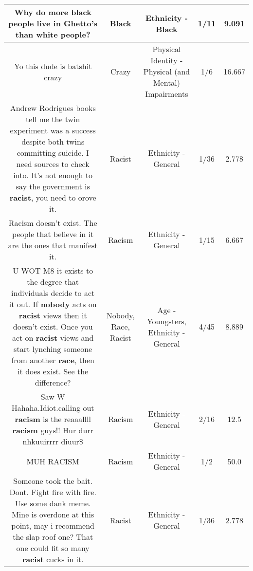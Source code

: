 \documentclass[11pt]{article}
\newlength\mylength
\begin{document}
\begin{center}
\begin{longtable}{|C{.65\mylength}|C{.30\mylength}|C{.12\mylength}|C{.12\mylength}|C{.12\mylength}|}
  \small Why do more \textbf{black} people live in Ghetto's than white people?\normalsize   & Black & Ethnicity - Black & 1/11 & 9.091 \\  \hline
  \small Yo this dude is batshit crazy\normalsize   & Crazy & Physical Identity - Physical (and Mental) Impairments & 1/6 & 16.667 \\  \hline
  \small Andrew Rodrigues books tell me the twin experiment was a success despite both twins committing suicide. I need sources to check into. It's not enough to say the government is \textbf{racist}, you need to orove it.\normalsize   & Racist & Ethnicity - General & 1/36 & 2.778 \\  \hline
  \small Racism doesn't exist. The people that believe in it are the ones that manifest it.\normalsize   & Racism & Ethnicity - General & 1/15 & 6.667 \\  \hline
  \small U WOT M8 it exists to the degree that individuals decide to act it out. If \textbf{nobody} acts on \textbf{racist} views then it doesn't exist. Once you act on \textbf{racist} views and start lynching someone from another \textbf{race}, then it does exist. See the difference?\normalsize   & Nobody, Race, Racist & Age - Youngsters, Ethnicity - General & 4/45 & 8.889 \\  \hline
  \small Saw W Hahaha.Idiot.calling out \textbf{racism} is the reaaallll \textbf{racism} guys!! Hur durr nhkuuirrrr diuur\$\normalsize   & Racism & Ethnicity - General & 2/16 & 12.5 \\  \hline
  \small MUH RACISM\normalsize   & Racism & Ethnicity - General & 1/2 & 50.0 \\  \hline
  \small Someone took the bait. Dont. Fight fire with fire. Use some dank meme. Mine is overdone at this point, may i recommend the slap roof one? That one could fit so many \textbf{racist} cucks in it.\normalsize   & Racist & Ethnicity - General & 1/36 & 2.778 \\  \hline

\end{longtable}
\end{center}
\end{document}
